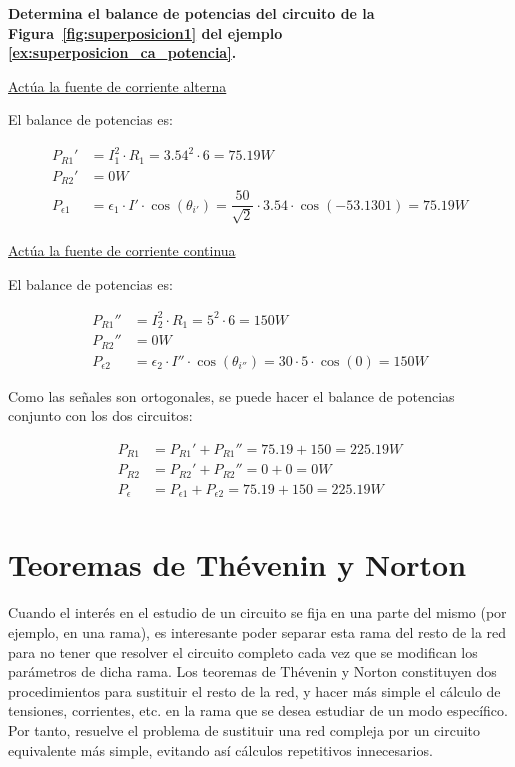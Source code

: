 	
\begin{example}\label{ex:superposicion_ca_potencia}
  \textbf{Determina el balance de potencias del circuito de la Figura~\ref{fig:superposicion1} del ejemplo \ref{ex:superposicion_ca_potencia}.}

\underline{Actúa la fuente de corriente alterna}

El balance de potencias es:

\begin{align*}
  P_{R1}' &= I_1^2\cdot R_1= 3.54^2\cdot 6= {75.19}{W}\\
  P_{R2}' &= {0} W\\
  P_{\epsilon1} &= \epsilon_1 \cdot {I'}\cdot\cos(\theta_{i'}) = \dfrac{50}{\sqrt{2}}\cdot 3.54\cdot\cos(-53.1301) = 75.19 W
\end{align*}

\underline{Actúa la fuente de corriente continua}

El balance de potencias es:

\begin{align*}
  P_{R1}'' &= I_2^2 \cdot R_1=5^2\cdot 6 = {150} W\\
  P_{R2}'' &= {0} W\\
  P_{\epsilon2} &= \epsilon_2 \cdot I''\cdot\cos(\theta_{i''}) = 30\cdot 5\cdot\cos(0)  = {150} W
\end{align*}

Como las señales son ortogonales, se puede hacer el balance de
potencias conjunto con los dos circuitos:

\begin{align*}
  P_{R1} &= P_{R1}' + P_{R1}'' = 75.19+150={225.19} W\\
  P_{R2} &= P_{R2}' + P_{R2}'' = 0+0 = {0} W\\
  P_{\epsilon} &= P_{\epsilon1} + P_{\epsilon2} = 75.19 + 150={225.19} W\\
\end{align*}
\end{example}
	
\section{Teoremas de Thévenin y Norton}
Cuando el interés en el estudio de un circuito se fija en una parte
del mismo (por ejemplo, en una rama), es interesante poder separar
esta rama del resto de la red para no tener que resolver el circuito
completo cada vez que se modifican los parámetros de dicha rama.  Los
teoremas de Thévenin y Norton constituyen dos procedimientos para
sustituir el resto de la red, y hacer más simple el cálculo de
tensiones, corrientes, etc. en la rama que se desea estudiar de un
modo específico. Por tanto, resuelve el problema de sustituir una red
compleja por un circuito equivalente más simple, evitando así cálculos
repetitivos innecesarios.


